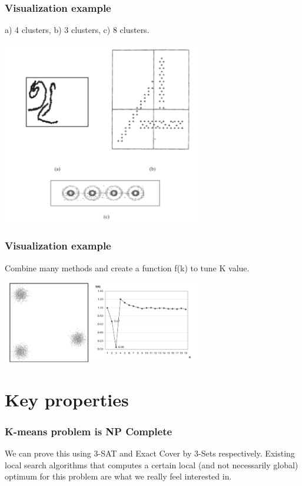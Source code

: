 \documentclass[9pt]{beamer}
\begin{document}
\begin{frame}
	\frametitle{Visualization example}
a) 4 clusters, b) 3 clusters, c) 8 clusters.
\centerline{\includegraphics[width=0.65\textwidth]{figures/vis.png}}

\end{frame}

\begin{frame}
	\frametitle{Visualization example}
Combine many methods and create a function f(k) to tune K value.
\centerline{\includegraphics[width=0.65\textwidth]{figures/vis2.png}}

\end{frame}

\section{Key properties}
\begin{frame}
	\frametitle{K-means problem is NP Complete}
We can prove this using 3-SAT and Exact Cover by 3-Sets respectively. Existing local search algorithms that computes a certain local (and not necessarily global) optimum for this problem are what we really feel interested in.\par
\end{frame}
\end{document}
